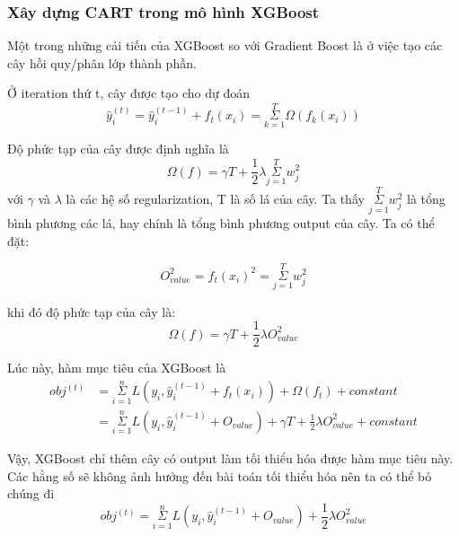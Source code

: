     \subsubsection{Xây dựng CART trong mô hình XGBoost}
    Một trong những cải tiến của XGBoost so với Gradient Boost là ở việc tạo các cây hồi quy/phân lớp thành phần.
    
    Ở iteration thứ t, cây được tạo cho dự đoán 
    \begin{equation}
        \hat{y}_{i}^{(t)} =  \hat{y}_{i}^{(t-1)} + f_{t} (x_{i}) = \underset{k=1}{\overset{T}{\Sigma}}\Omega(f_{k}(x_{i}))
    \end{equation}
    
    Độ phức tạp của cây được định nghĩa là \cite{xgboost_model_tut}
    \begin{equation}
        \Omega(f) = \gamma T + \frac{1}{2} \lambda \underset{j=1}{\overset{T}{\Sigma}} w^{2}_{j}
    \end{equation}
    với $\gamma$ và $\lambda$ là các hệ số regularization, T là số lá của cây. Ta thấy $\underset{j=1}{\overset{T}{\Sigma}}w^{2}_{j}$ là tổng bình phương các lá, hay chính là tổng bình phương output của cây. Ta có thể đặt:
    
    \begin{equation}
        O^{2}_{value} = f_{t} (x_{i})^2 = \underset{j=1}{\overset{T}{\Sigma}}w^{2}_{j}
    \end{equation}
    
    khi đó độ phức tạp của cây là:
    \begin{equation}
        \Omega(f) = \gamma T + \frac{1}{2} \lambda  O^{2}_{value}
    \end{equation}
    
    Lúc này, hàm mục tiêu của XGBoost là \cite{xgboost_model_tut} \cite{starmer_2020_XGB}
    \begin{equation}
    \begin{split}
         obj^{(t)} & =  \underset{i=1}{\overset{n}{\Sigma}} L(y_{i}, \hat{y}_{i}^{(t-1)} + f_{t} (x_{i})) 
            + \Omega(f_{t}) + constant \\
           & = \underset{i=1}{\overset{n}{\Sigma}} L(y_{i}, \hat{y}_{i}^{(t-1)} + O_{value}) 
            + \gamma T + \frac{1}{2} \lambda  O^{2}_{value} + constant
    \end{split}
    \end{equation}
    
    Vậy, XGBoost chỉ thêm cây có output làm tối thiểu hóa được hàm mục tiêu này. Các hằng số sẽ không ảnh hưởng đến bài toán tối thiểu hóa nên ta có thể bỏ chúng đi
    \begin{equation}
         obj^{(t)} = \underset{i=1}{\overset{n}{\Sigma}} L(y_{i}, \hat{y}_{i}^{(t-1)} + O_{value}) 
         + \frac{1}{2} \lambda  O^{2}_{value}
    \end{equation}
    
